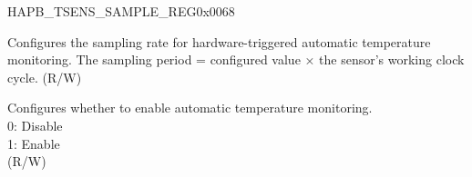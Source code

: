 \begin{register}{H}{APB\_TSENS\_SAMPLE\_REG}{0x0068}\label{regdesc:APBTSENSSAMPLEREG}
%
%
%
\regnewline%
\begin{regdesc}\begin{reglist}
\label{fielddesc:APBSARADCTSENSSAMPLERATE}\item [APB\_SARADC\_TSENS\_SAMPLE\_RATE] Configures the sampling rate for hardware-triggered automatic temperature monitoring. The sampling period = configured value × the sensor's working clock cycle. (R/W)
\label{fielddesc:APBSARADCTSENSSAMPLEEN}\item [APB\_SARADC\_TSENS\_SAMPLE\_EN] Configures whether to enable automatic temperature monitoring. \\
0: Disable\\
1: Enable\\
(R/W)
\end{reglist}\end{regdesc}
\end{register}
